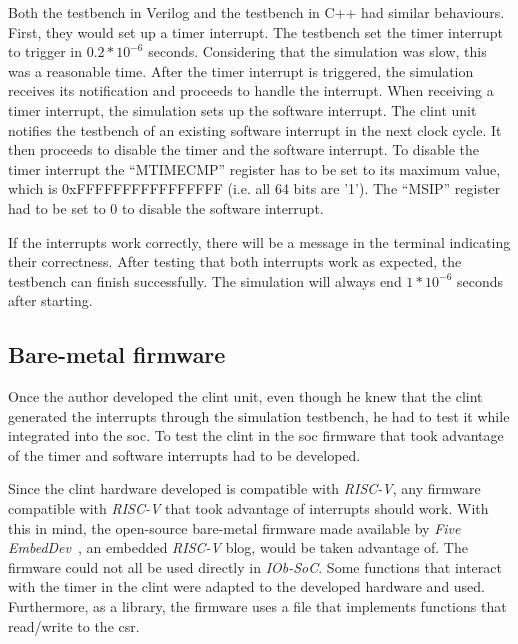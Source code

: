 Both the testbench in Verilog and the testbench in C++ had similar behaviours. First, they would set up a timer interrupt. The testbench set the timer interrupt to trigger in $0.2*10^{-6}$ seconds. Considering that the simulation was slow, this was a reasonable time. After the timer interrupt is triggered, the simulation receives its notification and proceeds to handle the interrupt. When receiving a timer interrupt, the simulation sets up the software interrupt. The \acrshort{clint} unit notifies the testbench of an existing software interrupt in the next clock cycle. It then proceeds to disable the timer and the software interrupt. To disable the timer interrupt the \enquote{MTIMECMP} register has to be set to its maximum value, which is 0xFFFFFFFFFFFFFFFF (i.e. all 64 bits are '1'). The \enquote{MSIP} register had to be set to 0 to disable the software interrupt.

If the interrupts work correctly, there will be a message in the terminal indicating their correctness. After testing that both interrupts work as expected, the testbench can finish successfully. The simulation will always end $1*10^{-6}$ seconds after starting.

\subsection{Bare-metal firmware}
\label{subsection:interrupt_firmware}
Once the author developed the \acrshort{clint} unit, even though he knew that the \acrshort{clint} generated the interrupts through the simulation testbench, he had to test it while integrated into the \acrshort{soc}. To test the \acrshort{clint} in the \acrshort{soc} firmware that took advantage of the timer and software interrupts had to be developed.

Since the \acrshort{clint} hardware developed is compatible with \textit{RISC-V}, any firmware compatible with \textit{RISC-V} that took advantage of interrupts should work. With this in mind, the open-source bare-metal firmware made available by \textit{Five EmbedDev}~\cite{bare_metal_int}, an embedded \textit{RISC-V} blog, would be taken advantage of. The firmware could not all be used directly in \textit{IOb-SoC}. Some functions that interact with the timer in the \acrshort{clint} were adapted to the developed hardware and used. Furthermore, as a library, the firmware uses a file that implements functions that read/write to the \acrlong{csr}.

